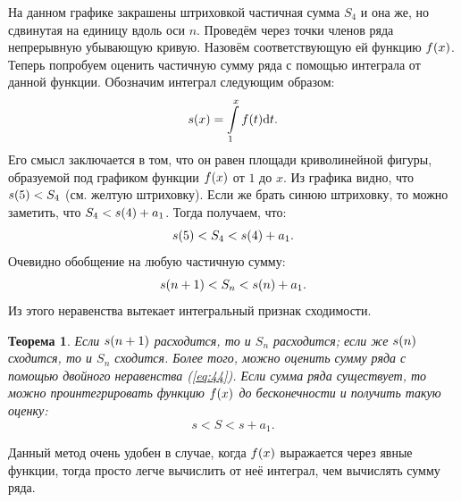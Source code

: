 \documentclass[12pt]{article}
\newtheorem{theorem}{Теорема}[section]
\begin{document}
На данном графике закрашены штриховкой частичная сумма $S_4$ и она же, но сдвинутая на единицу вдоль оси $n$. Проведём через точки членов ряда непрерывную убывающую кривую. Назовём соответствующую ей функцию $f\qty(x)$. Теперь попробуем оценить частичную сумму ряда с помощью интеграла от данной функции. Обозначим интеграл следующим образом:
\begin{equation}
    s\qty(x) = \int\limits_1^x f\qty(t) \dd t.
\end{equation}
Его смысл заключается в том, что он равен площади криволинейной фигуры, образуемой под графиком функции $f\qty(x)$ от $1$ до $x$. Из графика видно, что $s\qty(5) < S_4$ (см. желтую штриховку). Если же брать синюю штриховку, то можно заметить, что $S_4 < s\qty(4) + a_1$. Тогда получаем, что:
\begin{equation}
    s\qty(5) < S_4 <  s\qty(4) + a_1.
\end{equation}
Очевидно обобщение на любую частичную сумму:
\begin{equation}\label{eq:44}
    s\qty(n+1) < S_n < s\qty(n) + a_1.
\end{equation}
Из этого неравенства вытекает интегральный признак сходимости.
\begin{theorem}
Если $s\qty(n+1)$ расходится, то и $S_n$ расходится; если же $s\qty(n)$ сходится, то и $S_n$ сходится. Более того, можно оценить сумму ряда с помощью двойного неравенства (\ref{eq:44}). Если сумма ряда существует, то можно проинтегрировать функцию $f\qty(x)$ до бесконечности и получить такую оценку:
\begin{equation}
    s < S < s + a_1.
\end{equation}
\end{theorem}
Данный метод очень удобен в случае, когда $f\qty(x)$ выражается через явные функции, тогда просто легче вычислить от неё интеграл, чем вычислять сумму ряда.
\end{document}
